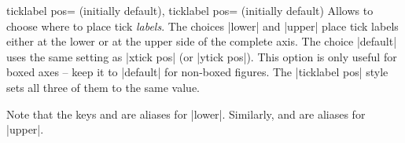 \begin{pgfplotsxykeylist}{%
    \x ticklabel pos= (initially default),
       ticklabel pos= (initially default)%
}
    Allows to choose where to place tick \emph{labels}. The choices |lower| and
    |upper| place tick labels either at the lower or at the upper side of the
    complete axis. The choice |default| uses the same setting as |xtick pos|
    (or |ytick pos|). This option is only useful for boxed axes -- keep it to
    |default| for non-boxed figures. The |ticklabel pos| style sets all three
    of them to the same value.

    Note that the keys  and  are aliases
    for |lower|. Similarly,  and  are
    aliases for |upper|.
\end{pgfplotsxykeylist}

